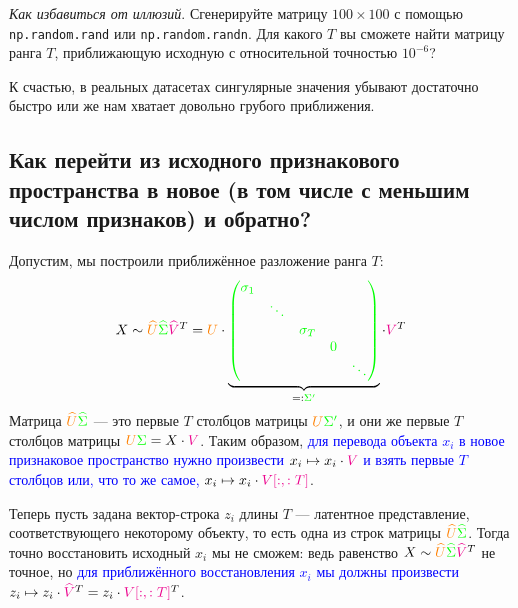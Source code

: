 \documentclass{amsart}
\theoremstyle{definition}
\theoremstyle{remark}
\numberwithin{equation}{section}
\begin{document}
\medskip

\textit{Как избавиться от иллюзий}. Сгенерируйте матрицу $100\times100$ с помощью \texttt{np.random.rand} или \texttt{np.random.randn}. Для какого $T$ вы сможете найти матрицу ранга $T$, приближающую исходную с относительной точностью $10^{-6}$?

\medskip

К счастью, в реальных датасетах сингулярные значения убывают достаточно быстро или же нам хватает довольно грубого приближения.

\subsection{Как перейти из исходного признакового пространства в новое (в том числе с меньшим числом признаков) и обратно?}

Допустим, мы построили приближённое разложение ранга $T$:
$$X\sim\textcolor{orange}{\widehat{U}}\textcolor{green}{\widehat{\Sigma}}\textcolor{magenta}{\widehat{V}}^T = 
\textcolor{orange}{U}\cdot\underbrace{\textcolor{green}{\begin{pmatrix}
\sigma_1 &\\
 & \ddots & \\
 & & \sigma_T &\\
& & & 0 & \\
& & & & \ddots\end{pmatrix}}}_{=:\textcolor{green}{\Sigma'}}\cdot\textcolor{magenta}{V}^T$$
Матрица $\textcolor{orange}{\widehat{U}}\textcolor{green}{\widehat{\Sigma}}$ --- это первые $T$ столбцов матрицы $\textcolor{orange}{U}\textcolor{green}{\Sigma'}$, и они же первые $T$ столбцов матрицы $\textcolor{orange}{U}\textcolor{green}{\Sigma} = X\cdot\textcolor{magenta}{V}$. Таким образом, \textcolor{blue}{для перевода объекта $x_i$ в новое признаковое пространство нужно произвести $x_i\mapsto x_i\cdot\textcolor{magenta}{V}$ и взять первые $T$ столбцов или, что то же самое, $x_i\mapsto x_i\cdot\textcolor{magenta}{V[:,:T]}$}.

Теперь пусть задана вектор-строка $z_i$ длины $T$ --- латентное представление, соответствующего некоторому объекту, то есть одна из строк матрицы $\textcolor{orange}{\widehat{U}}\textcolor{green}{\widehat{\Sigma}}$. Тогда точно восстановить исходный $x_i$ мы не сможем: ведь равенство $X\sim\textcolor{orange}{\widehat{U}}\textcolor{green}{\widehat{\Sigma}}\textcolor{magenta}{\widehat{V}}^T$ не точное, но \textcolor{blue}{для приближённого восстановления $x_i$ мы должны произвести $z_i\mapsto z_i\cdot \textcolor{magenta}{\widehat{V}}^T = z_i\cdot\textcolor{magenta}{V[:,:T]}^T$}.
\end{document}
